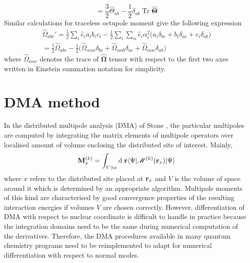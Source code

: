 \documentclass[a4paper,titlepage,twoside,fleqn,12pt]{book}
\newcommand{\BM}[1]{\bm{#1}}
\begin{document}
\begin{appendices}
\begin{refsection}
\begin{equation}
= \frac{3}{2}\hat{\Theta}_{ab} - \frac{1}{2}\delta_{ab}\;\mathrm{Tr}\;\hat{\BM \Theta}  
\end{equation}
%
Similar calculations for traceless octupole moment give the
following expression
%
\begin{multline}
\hat{\Omega}_{abc}' = \frac{5}{2}\sum_i \hat{e}_ia_ib_ic_i - \frac{1}{2}\sum_i\sum_{\alpha}\hat{e}_i\alpha_i^2 \big(
                                        a_i\delta_{bc} + b_i\delta_{ac} + c_i\delta_{ab}  \big) \\ 
= \frac{5}{2}\hat{\Omega}_{abc} - \frac{1}{2} \big( \hat{\Omega}_{\alpha\alpha a}\delta_{bc} +
                                                \hat{\Omega}_{\alpha\alpha b}\delta_{ac} + 
                                                \hat{\Omega}_{\alpha\alpha c}\delta_{ab}  \big) 
\end{multline}
%
where $\hat{\Omega}_{\alpha\alpha c}$ denotes the trace of $\hat{\BM\Omega}$ 
tensor with respect to the first two axes written in Einstein
summation notation for simplicity. 

\section{DMA method}

In the distributed multipole analysis 
(DMA) of Stone \citep{Stone.JCTC.2005}, the particular multipoles
are computed by integrating the matrix elements of multipole
operators over localised amount of volume enclosing the distributed
site of interest. Mainly,
%
\begin{equation}
{\bf M}^{(k)}_x  = \int_{V\ni x} {\rm d}\;{\bf r}
   \langle \Psi  \lvert \mathscr{M}^{(k)} ({\bf r}_x) \rvert  \Psi \rangle
\end{equation}
%
where $x$ refers to the distributed site placed at ${\bf r}_x$
and $V$ is the volume of space around it which is
determined by an appropriate algorithm. 
Multipole moments of this kind are characterised by good convergence
properties of the resulting interaction energies
if volumes $V$ are chosen correctly. 
However, differentiation of DMA with respect to nuclear coordinate
is difficult to handle in practice because the integration domains need to be the same
during numerical computation of the derivatives. Therefore, the DMA
procedures available in many quantum chemistry programs 
need to be reimplemented to adapt for numerical differentiation with respect
to normal modes.


\end{refsection}
\end{appendices}
\end{document}

